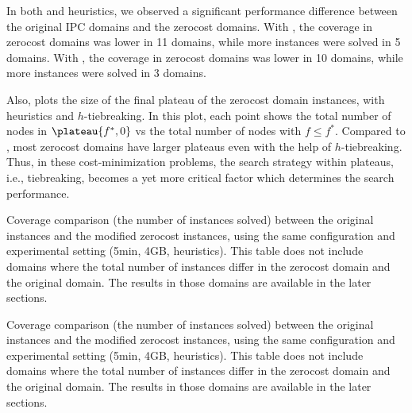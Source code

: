 In both \lmcut and \mands heuristics, we observed a significant
performance difference between the original IPC domains and the zerocost
domains. With \lmcut, the coverage in zerocost domains
was lower in 11 domains, while more instances were solved
in 5 domains. With \mands, the coverage in zerocost domains was lower in 10 domains, while
more instances were solved in 3 domains.

Also,  plots the size of the final plateau of the
zerocost domain instances, with \lmcut heuristics and $h$-tiebreaking. In this plot,
each point shows the total number of nodes in $\plateau{f^*,0}$ vs the
total number of nodes with $f\leq f^*$. Compared to ,
most zerocost domains have larger plateaus even with the help of
$h$-tiebreaking.  Thus, in these cost-minimization problems, the search
strategy within plateaus, i.e., tiebreaking, becomes a yet more critical
factor which determines the search performance.

\begin{table}[htbp]
 \centering
 
 \caption{
 Coverage comparison (the number of instances solved) 
 between the original instances and the modified zerocost instances,
 using the same configuration and experimental setting (5min, 4GB, \lmcut heuristics).
 This table does not include domains where the total number of instances
 differ in the zerocost domain and the original domain. The results in
 those domains are available in the later sections.
 }
 \label{tbl:lmcut-zerocost-std}
\end{table}

\begin{table}[htbp]
 \centering
 
 \caption{
 Coverage comparison (the number of instances solved) 
 between the original instances and the modified zerocost instances,
 using the same configuration and experimental setting (5min, 4GB, \mands heuristics).
 This table does not include domains where the total number of instances
 differ in the zerocost domain and the original domain. The results in
 those domains are available in the later sections.
 }
 \label{tbl:mands-zerocost-std}
\end{table}

